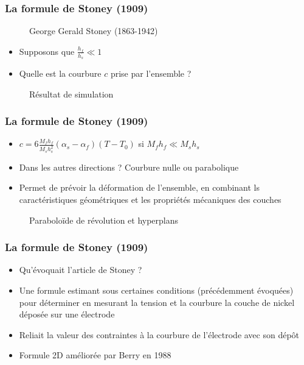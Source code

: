 \begin{frame}
    \frametitle{La formule de Stoney (1909)}
    
    \begin{figure}
        \centering
        \caption{George Gerald Stoney (1863-1942)}
    \end{figure}

    \begin{itemize}
        \item Supposons que $\frac{h_f}{h_s} \ll 1$
        \item Quelle est la courbure $c$ prise par l'ensemble ?
    \end{itemize}
    
    \begin{figure}
        \centering
        \caption{Résultat de simulation}
    \end{figure}
    
\end{frame}



\begin{frame}
    \frametitle{La formule de Stoney (1909)}

    \begin{itemize}
        \item $c = 6\frac{M_fh_f}{M_sh_s^2}(\alpha_s-\alpha_f)(T-T_0)$ si $M_fh_f \ll M_sh_s$ 
        \item Dans les autres directions ? Courbure nulle ou parabolique
        \item Permet de prévoir la déformation de l'ensemble, en combinant ls caractéristiques géométriques et les propriétés mécaniques des couches
    \end{itemize}
    
    \begin{figure}
        \centering
        \caption{Paraboloïde de révolution et hyperplans}
    \end{figure}
    
\end{frame}


\begin{frame}
    \frametitle{La formule de Stoney (1909)}

    \begin{itemize}
        \item Qu'évoquait l'article de Stoney ?
        \item Une formule estimant sous certaines conditions (précédemment évoquées) pour déterminer en mesurant la tension et la courbure la couche de nickel déposée sur une électrode 
        \item Reliait la valeur des contraintes à la courbure de l'électrode avec son dépôt
        \item Formule 2D améliorée par Berry en 1988
    \end{itemize}
    
\end{frame}


